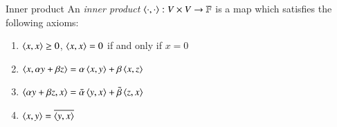 \begin{myDefinition}{Inner product}{}
    An \emph{inner product} $\braket{\cdot, \cdot} : V\times V \to \mathbb{F}$ is a map which satisfies the following axioms:
   \begin{enumerate}
       \item $\braket{x,x} \geq 0$, \quad $\braket{x,x} = 0$ if and only if $x = 0$ \hfill {}
       \item $\braket{x,\alpha y + \beta z} = \alpha\braket{x,y} + \beta\braket{x,z}$ 
       \item $\braket{\alpha y + \beta z, x} = \bar{\alpha}\braket{y,x} + \bar{\beta}\braket{z,x}$ 
       \item $\braket{x,y} = \overline{\braket{y,x}}$ 
   \end{enumerate}
\end{myDefinition}
